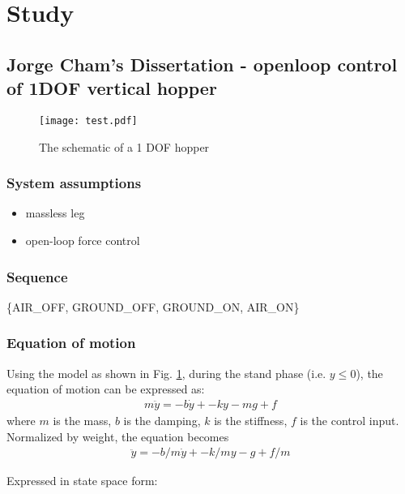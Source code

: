 \section{Study }

\subsection{Jorge Cham's Dissertation - openloop control of 1DOF vertical hopper }
\begin{figure}[h]
\centering

\texttt{[image: test.pdf]} 
\caption{The schematic of a 1 DOF hopper \cite{Cham2002}}
\label{fig.1DOF-Hopper}
\end{figure}

\subsubsection{System assumptions}
\begin{itemize}
\item massless leg
\item open-loop force control
\end{itemize}
\subsubsection{Sequence}
\{AIR\_OFF, GROUND\_OFF, GROUND\_ON, AIR\_ON\}


\subsubsection{Equation of motion}
Using the model as shown in Fig. \ref{fig.1DOF-Hopper}, during the stand phase (i.e. $y\leq 0$), the equation of motion can be expressed as:
\begin{align*}
m \ddot y = -b\dot y +-ky -mg + f
\end{align*}
\noindent where $m$ is the mass, $b$ is the damping, $k$ is the stiffness, $f$ is the control input.
Normalized by weight, the equation becomes
\begin{align*}
 \ddot y = -b/m\dot y +-k/my -g + f/m
\end{align*}

\noindent Expressed in state space form:

